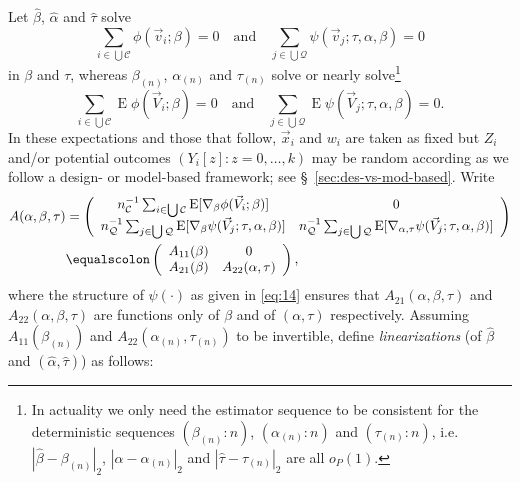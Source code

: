 \documentclass{article}
\newcommand{\eqdef}{\ensuremath{\equalscolon}}
\newcommand{\EE}{\operatorname{E}}
\begin{document}
Let $\hat\beta$, $\hat{\alpha}$ and $\hat\tau$ solve
\[\sum_{i\in \bigcup \mathcal{C}}\phi(\vec{v}_{i}; \beta )
  =0\quad\text{and}\quad
\sum_{j\in \bigcup \mathcal{Q}}\psi(\vec{v}_{j}; \tau,
\alpha, \beta )  =0
  \]
  in $\beta$ and $\tau$, whereas $\beta_{(n)}$, $\alpha_{(n)}$ and $\tau_{(n)}$ solve or nearly solve\footnote{%
In actuality we only need the estimator sequence to be consistent for the deterministic sequences $(\beta_{(n)}:n)$, $(\alpha_{(n)}:n)$ and $(\tau_{(n)}:n)$, i.e. $|\hat\beta - \beta_{(n)}|_{2}$, $|\hat\alpha - \alpha_{(n)}|_{2}$ and $|\hat\tau - \tau_{(n)}|_{2}$ are all $o_{P}(1)$.%
}
\[\sum_{i\in \bigcup \mathcal{C}}\EE\phi(\vec{V}_{i}; \beta )
  =0\quad\text{and}\quad
\sum_{j\in \bigcup \mathcal{Q}}\EE\psi(\vec{V}_{j}; \tau,
\alpha, \beta )  =0.
  \]
In these expectations and those that follow, $\vec{x}_{i}$ and $w_{i}$
are taken as fixed but $Z_{i}$ and/or potential outcomes $(Y_{i}[z]:
z=0, \ldots, k)$ may be random according as we follow a design- or
model-based framework; see \S~\ref{sec:des-vs-mod-based}.
  Write
  \begin{align}
\nonumber
    A(\alpha, \beta, \tau) &= \left(
      \begin{array}{cc}
        n_{\mathcal{C}}^{-1}\sum_{i\in \bigcup
        \mathcal{C}}\EE [\nabla_{\beta}\phi(\vec{V}_{i};
        \beta )]&0\\
        n_{\mathcal{Q}}^{-1}\sum_{j\in \bigcup
        \mathcal{Q}}\EE[ \nabla_{\beta}\psi(\vec{V}_{j};
        \tau, \alpha, \beta )]  & n_{\mathcal{Q}}^{-1}\sum_{j\in \bigcup
        \mathcal{Q}}\EE[ \nabla_{\alpha, \tau}\psi(\vec{V}_{j};
        \tau, \alpha, \beta )]
      \end{array}
                                  \right)\\
    \label{eq:13}    
    &\eqdef \left(
      \begin{array}{cc}
        A_{11}(\beta)& 0\\
        A_{21}(\beta) & A_{22}(\alpha, \tau)
      \end{array}
\right),
  \end{align}
where the structure of $\psi(\cdot)$ as given in \eqref{eq:14} ensures
that $A_{21}(\alpha, \beta, \tau)$ and $A_{22}(\alpha, \beta, \tau)$
are functions only of $\beta$ and of $(\alpha, \tau)$
respectively. Assuming $A_{11}(\beta_{(n)})$ and $A_{22}(\alpha_{(n)},
\tau_{(n)})$ to be invertible, define \textit{linearizations} (of
$\hat\beta$ and $(\hat\alpha, \hat\tau)$) as follows:
\end{document}
